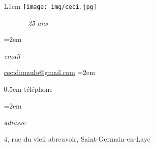 \documentclass[10pt,a4paper]{scrartcl}
\newlength{\datebox}\settowidth{\datebox}{10.2018-1.2018} %
\newcommand{\NewEntryL}[3]{\noindent\hangindent=2em\hangafter=0 \parbox{\datebox}{\normalsize \textit{#1}}\hspace{5em} #2 #3 %
\vspace{0.5em}} %
\newcommand{\Description}[1]{\hangindent=2em\hangafter=0\raggedright\footnotesize{#1}\par\normalsize\vspace{1em}} %
\begin{document}
\thispagestyle{empty} %


\begin{wrapfigure}{L}{1em}
 \hspace*{-10em}
 \texttt{[image: img/ceci.jpg]}
\end{wrapfigure}

\begin{cv}{ \ \ \ \ \ \ \  \color{black}\large\emph{25 ans}}\vspace{2em} %


\NewEntryL{email}{\href{mailto:cecidimaulo@gmail.com}{cecidimaulo@gmail.com}} %

\NewEntryL{t\'{e}l\'{e}phone}{ +33 6 26 30 86 90} %

\NewEntryL{adresse}{ 4, rue du vieil abreuvoir, Saint-Germain-en-Laye} %

\vspace{1.2em} %




\vspace{1.5em} %


\end{cv}
\end{document}
